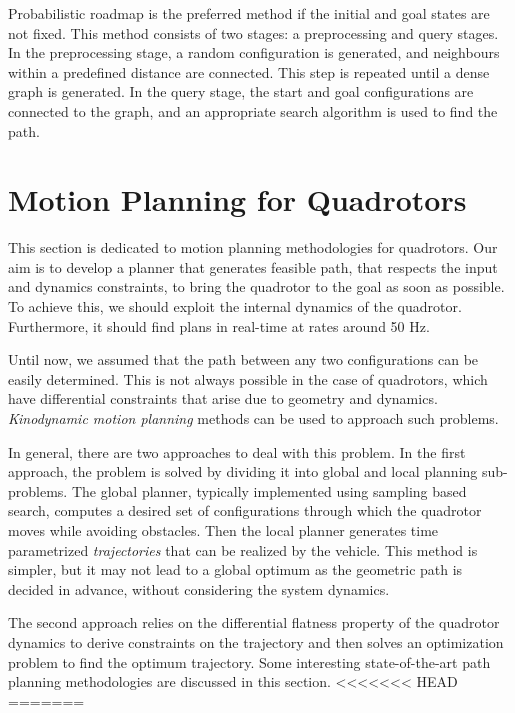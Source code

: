 Probabilistic roadmap is the preferred method if the initial and goal states are not fixed. This method consists of two stages: a preprocessing and query stages. In the preprocessing stage, a random configuration is generated, and neighbours within a predefined distance are connected. This step is repeated until a dense graph is generated. In the query stage, the start and goal configurations are connected to the graph, and an appropriate search algorithm is used to find the path. 

\section{Motion Planning for Quadrotors}
This section is dedicated to motion planning methodologies for quadrotors. 
Our aim is to develop a planner that generates feasible path, that respects the input and dynamics constraints, to bring the quadrotor to the goal as soon as possible. To achieve this, we should exploit the internal dynamics of the quadrotor. Furthermore, it should find plans in real-time at rates around 50 Hz. 

Until now, we assumed that the path between any two configurations can be easily determined. This is not always possible in the case of quadrotors, which have differential constraints that arise due to geometry and dynamics. \textit{Kinodynamic motion planning} \cite{donald1993kinodynamic} methods can be used to approach such problems. 

In general, there are two approaches to deal with this problem. In the first approach, the problem is solved by dividing it into global and local planning sub-problems. The global planner, typically implemented using sampling based search, computes a desired set of configurations through which the quadrotor moves while avoiding obstacles. Then the local planner generates time parametrized \textit{trajectories} that can be realized by the vehicle. This method is simpler, but it may not lead to a global optimum as the geometric path is decided in advance, without considering the system dynamics. 

The second approach relies on the differential flatness \cite{mellinger2011minimum} property of the quadrotor dynamics to derive constraints on the trajectory and then solves an optimization problem to find the optimum trajectory. Some interesting state-of-the-art path planning methodologies are discussed in this section. 
<<<<<<< HEAD
=======

